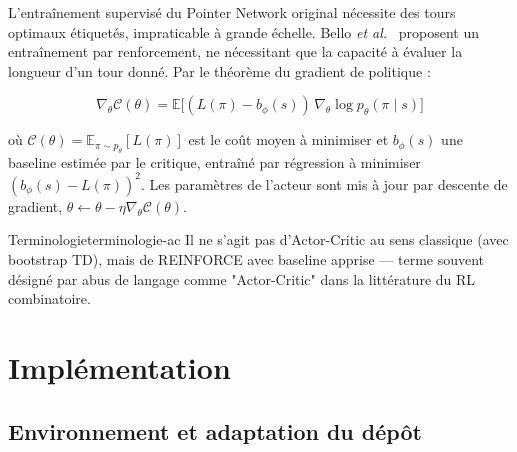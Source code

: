 \documentclass[12pt, a4paper, twoside, openright]{book}
\begin{document}
L'entraînement supervisé du Pointer Network original nécessite des tours
optimaux étiquetés, impraticable à grande échelle. Bello \textit{et al.}~\cite{bello2016neural}
proposent un entraînement par renforcement, ne nécessitant que la capacité à
évaluer la longueur d'un tour donné. Par le théorème du gradient de
politique :

\begin{equation}
	\nabla_\theta \mathcal{C}(\theta) = \mathbb{E}\big[(L(\pi) - b_\phi(s))\, \nabla_\theta \log p_\theta(\pi \mid s)\big]
	\label{eq:reinforce-baseline}
\end{equation}

où $\mathcal{C}(\theta)=\mathbb{E}_{\pi\sim p_\theta}[L(\pi)]$ est le coût moyen à minimiser et $b_\phi(s)$ une baseline estimée par le critique, entraîné par régression à minimiser $(b_\phi(s)-L(\pi))^2$. Les paramètres de l'acteur sont mis à jour par descente de gradient, $\theta\leftarrow\theta-\eta\nabla_\theta\mathcal{C}(\theta)$.

\begin{algorithm}[H]
	\caption{Entraînement Actor-Critic / REINFORCE (Bello et al., 2016)}
	\label{alg:actor-critic}
\end{algorithm}

\begin{remark}{Terminologie}{terminologie-ac}
	Il ne s'agit pas d'Actor-Critic au sens classique (avec bootstrap TD), mais
	de REINFORCE avec baseline apprise --- terme souvent désigné par abus de
	langage comme "Actor-Critic" dans la littérature du RL combinatoire.
\end{remark}

\section{Implémentation}
\label{sec:ch4-implementation}

\subsection{Environnement et adaptation du dépôt}
\end{document}
